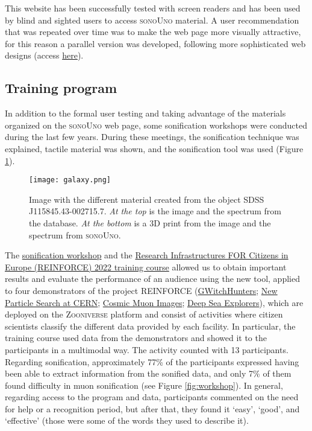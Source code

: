\documentclass[baaa]{baaa}
\begin{document}
This website has been successfully tested with screen readers and has been used by blind and sighted users to access \textsc{sonoUno} material. A user recommendation that was repeated over time was to make the web page more visually attractive, for this reason a parallel version was developed, following more sophisticated web designs (access \href{https://reinforce.sonouno.org.ar/}{here}).

\subsection{Training program}

In addition to the formal user testing and taking advantage of the materials organized on the \textsc{sonoUno} web page, some sonification workshops were conducted during the last few years. During these meetings, the sonification technique was explained, tactile material was shown, and the sonification tool was used (Figure \ref{fig:galaxy}).

\begin{figure}[!t]
\centering
    \texttt{[image: galaxy.png]}
    \caption{Image with the different material created from the object SDSS J115845.43-002715.7. \emph{At the top} is the image and the spectrum from the database. \emph{At the bottom} is a 3D print from the image and the spectrum from \textsc{sonoUno}.}
    \label{fig:galaxy}
\end{figure}

The \href{https://zenodo.org/records/7717030}{sonification workshop} and the \href{https://www.reinforceeu.eu/international-citizen-science-training-course}{Research Infrastructures FOR Citizens in Europe (REINFORCE) 2022 training course} allowed us to obtain important results and evaluate the performance of an audience using the new tool, applied to four demonstrators of the project REINFORCE (\href{https://www.zooniverse.org/projects/reinforce/gwitchhunters}{GWitchHunters}; \href{https://www.zooniverse.org/projects/reinforce/new-particle-search-at-cern}{New Particle Search at CERN}; \href{https://www.zooniverse.org/projects/reinforce/cosmic-muon-images}{Cosmic Muon Images}; \href{https://www.zooniverse.org/projects/reinforce/deep-sea-explorers}{Deep Sea Explorers}), which are deployed on the \textsc{Zooniverse} platform and consist of activities where citizen scientists classify the different data provided by each facility. In particular, the training course used data from the demonstrators and showed it to the participants in a multimodal way. The activity counted with 13 participants. Regarding sonification, approximately 77\% of the participants expressed having been able to extract information from the sonified data, and only 7\% of them found difficulty in muon sonification (see Figure \ref{fig:workshop}). In general, regarding access to the program and data, participants commented on the need for help or a recognition period, but after that, they found it `easy', `good', and `effective' (those were some of the words they used to describe it).
\end{document}
